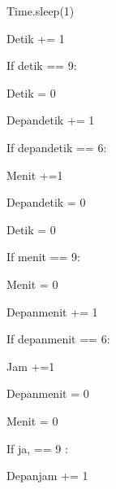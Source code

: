 \documentclass[a4paper,12pt]{report}
\begin{document}
\noindent 
{\fontsize{14pt}{14pt}\selectfont Time.sleep(1) \\} \par
\noindent 
{\fontsize{14pt}{14pt}\selectfont Detik += 1 \\} \par
\noindent 
{\fontsize{14pt}{14pt}\selectfont If detik == 9: \\} \par
\noindent 
{\fontsize{14pt}{14pt}\selectfont Detik = 0 \\} \par
\noindent 
{\fontsize{14pt}{14pt}\selectfont Depandetik += 1 \\} \par
\noindent 
{\fontsize{14pt}{14pt}\selectfont If depandetik == 6: \\} \par
\noindent 
{\fontsize{14pt}{14pt}\selectfont Menit +=1 \\} \par
\noindent 
{\fontsize{14pt}{14pt}\selectfont Depandetik = 0 \\} \par
\noindent 
{\fontsize{14pt}{14pt}\selectfont Detik = 0 \\} \par
\noindent 
{\fontsize{14pt}{14pt}\selectfont If menit == 9: \\} \par
\noindent 
{\fontsize{14pt}{14pt}\selectfont Menit = 0 \\} \par
\noindent 
{\fontsize{14pt}{14pt}\selectfont Depanmenit += 1 \\} \par
\noindent 
{\fontsize{14pt}{14pt}\selectfont If depanmenit == 6: \\} \par
\noindent 
{\fontsize{14pt}{14pt}\selectfont Jam +=1 \\} \par
\noindent 
{\fontsize{14pt}{14pt}\selectfont Depanmenit = 0 \\} \par
\noindent 
{\fontsize{14pt}{14pt}\selectfont Menit = 0 \\} \par
\noindent 
{\fontsize{14pt}{14pt}\selectfont If ja, == 9 : \\} \par
\noindent 
{\fontsize{14pt}{14pt}\selectfont Depanjam += 1 \\} \par
\end{document}
